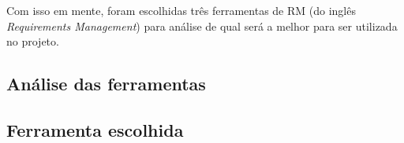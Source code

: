     Com isso em mente, foram escolhidas três ferramentas de RM (do inglês \textit{Requirements Management}) para análise de
    qual será a melhor para ser utilizada no projeto.  
    
    \subsection{Análise das ferramentas}
    
      
    
    \subsection{Ferramenta escolhida}
      
      
